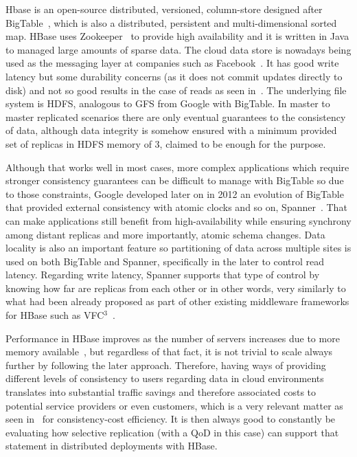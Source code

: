 Hbase is an open-source distributed, versioned, column-store designed after BigTable~\cite{Chang:2006}, which is also a distributed, persistent and multi-dimensional sorted map. HBase uses Zookeeper~\cite{Hunt:2010} to provide high availability and it is written in Java to managed large amounts of sparse data. The cloud data store is nowadays being used as the messaging layer at companies such as Facebook~\cite{FacebookHBase}. It has good write latency but some durability concerns (as it does not commit updates directly to disk) and not so good results in the case of reads as seen in~\cite{YCSB:2010}. The underlying file system is HDFS, analogous to GFS from Google with BigTable. In master to master replicated scenarios there are only eventual guarantees to the consistency of data, although data integrity is somehow ensured with a minimum provided set of replicas in HDFS memory of 3, claimed to be enough for the purpose.

Although that works well in most cases, more complex applications which require stronger consistency guarantees can be difficult to manage with BigTable so due to those constraints, Google developed later on in 2012 an evolution of BigTable that provided external consistency with atomic clocks and so on, Spanner~\cite{Corbett:2012}. That can make applications still benefit from high-availability while ensuring synchrony among distant replicas and more importantly, atomic schema changes. Data locality is also an important feature so partitioning of data across multiple sites is used on both BigTable and Spanner, specifically in the later to control read latency. Regarding write latency, Spanner supports that type of control by knowing how far are replicas from each other or in other words, very similarly to what had been already proposed as part of other existing middleware frameworks for HBase such as VFC$^{3}$~\cite{Vfc3:2012}.  

Performance in HBase improves as the number of servers increases due to more memory available~\cite{Carstoiu:2010}, but regardless of that fact, it is not trivial to scale always further by following the later approach. Therefore, having ways of providing different levels of consistency to users regarding data in cloud environments translates into substantial traffic savings and therefore associated costs to potential service providers or even customers, which is a very relevant matter as seen in~\cite{chihoub:2013} for consistency-cost efficiency. It is then always good to constantly be evaluating how selective replication (with a QoD in this case) can support that statement in distributed deployments with HBase.

